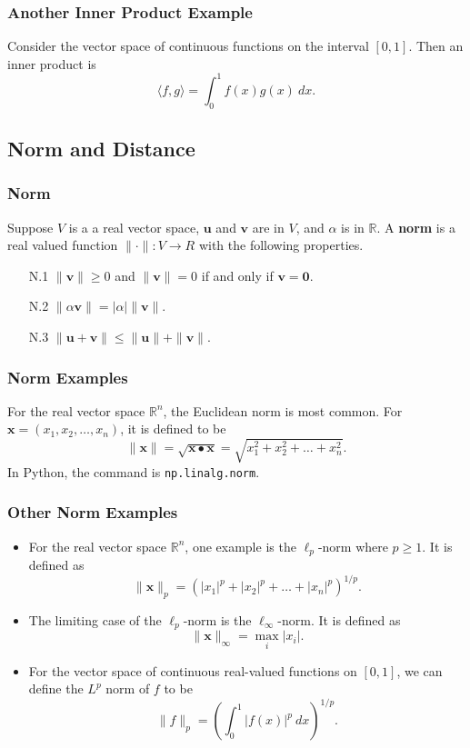 \documentclass{beamer}
\begin{document}
\begin{frame}
\frametitle{Another Inner Product Example}
Consider the vector space of continuous functions on the interval $[0, 1]$. Then an inner product is
$$
\langle f, g\rangle = \int_0^1 f(x) g(x)\ dx.
$$
\end{frame}

\subsection{Norm and Distance}

\begin{frame}
\frametitle{Norm}
\begin{Definition}
Suppose $V$ is a a real vector space, ${\boldsymbol u}$ and ${\boldsymbol v}$ are in $V$, and $\alpha$ is in $\mathbb{R}$. A {\bf norm} is a real valued function $\|\cdot\|: V\to R$  with the following properties.
\begin{enumerate}
\item[N.1] $\| {\boldsymbol v}\| \geq 0$ and $\| {\boldsymbol v}\| = 0$ if and only if ${\boldsymbol v} = {\boldsymbol 0}$.
\item[N.2] $\|\alpha {\boldsymbol v}\| = |\alpha| \| {\boldsymbol v}\|$.
\item[N.3] $\| {\boldsymbol u} + {\boldsymbol v}\| \leq \| {\boldsymbol u}\| + \| {\boldsymbol v}\|$.
\end{enumerate}
\end{Definition}
\end{frame}

\begin{frame}
\frametitle{Norm Examples}
For the real vector space $\mathbb{R}^n$, the Euclidean norm is most common. For ${\boldsymbol x} = \left(x_1, x_2, \ldots, x_n\right)$, it is defined to be
$$
\| {\boldsymbol x}\| = \sqrt{{\boldsymbol x}\bullet{\boldsymbol x}} =  \sqrt{x_1^2 + x_2^2 +\ldots + x_n^2}.
$$
In Python, the command is \texttt{np.linalg.norm}.
\end{frame}

\begin{frame}
\frametitle{Other Norm Examples}
\begin{itemize}
\item For the real vector space $\mathbb{R}^n$, one example is the $\ell_p$-norm where $p\geq 1$. It is defined as
$$
\| {\boldsymbol x}\|_p = \left(|x_1|^p + |x_2|^p + \ldots + |x_n|^p\right)^{1/p}.
$$
\item The limiting case of the $\ell_p$-norm is the $\ell_\infty$-norm. It is defined as
$$
\| {\boldsymbol x}\|_\infty = \max_{i} |x_i|.
$$

\item For the vector space of continuous real-valued functions on $[0, 1]$, we can define the $L^p$ norm of $f$ to be
$$
\| f\|_p = \left(\int_0^1 |f(x)|^p\ dx\right)^{1/p}.
$$
\end{itemize}
\end{frame}
\end{document}
